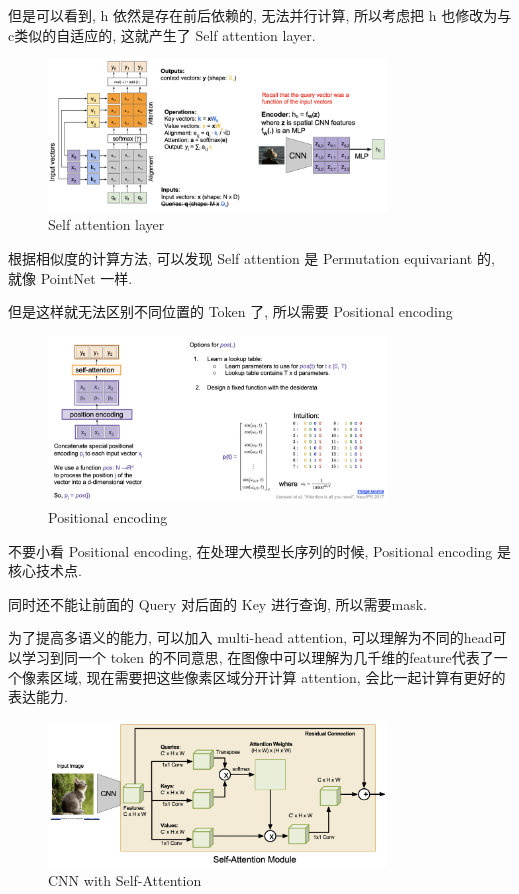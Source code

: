但是可以看到, h 依然是存在前后依赖的, 无法并行计算, 所以考虑把 h 也修改为与c类似的自适应的, 这就产生了 Self attention layer.

\begin{figure}[htbp]
    \centering
    \includegraphics[width=0.8\textwidth]{figures/paralle_q.png}
    \caption{Self attention layer}
    \label{fig:paralle_q}
\end{figure}

根据相似度的计算方法, 可以发现 Self attention 是 Permutation equivariant 的, 就像 PointNet 一样.

但是这样就无法区别不同位置的 Token 了, 所以需要 Positional encoding

\begin{figure}[htbp]
    \centering
    \includegraphics[width=0.8\textwidth]{figures/pos_encoding.png}
    \caption{Positional encoding}
    \label{fig:pos_encoding}
\end{figure}

不要小看 Positional encoding, 在处理大模型长序列的时候, Positional encoding 是核心技术点.

同时还不能让前面的 Query 对后面的 Key 进行查询, 所以需要mask.

为了提高多语义的能力, 可以加入 multi-head attention, 可以理解为不同的head可以学习到同一个 token 的不同意思,
在图像中可以理解为几千维的feature代表了一个像素区域, 现在需要把这些像素区域分开计算 attention, 会比一起计算有更好的表达能力.

\begin{figure}[htbp]
    \centering
    \includegraphics[width=0.8\textwidth]{figures/image_self_atten.png}
    \caption{CNN with Self-Attention}
    \label{fig:image_self_atten}
\end{figure}


